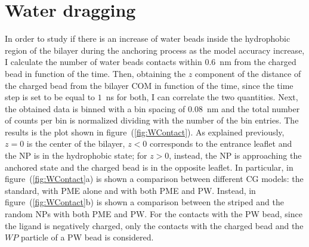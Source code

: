 \section{Water dragging}
\label{sec:WDragging}
In order to study if there is an increase of water beads inside the hydrophobic region of the bilayer during the anchoring process as the model accuracy increase, I calculate the number of water beads contacts within $0.6$~nm from the charged bead in function of the time. Then, obtaining the $z$ component of the distance of the charged bead from the bilayer \ac{COM} in function of the time, since the time step is set to be equal to $1$~ns for both, I can correlate the two quantities. Next, the obtained data is binned with a bin spacing of $0.08$~nm and the total number of counts per bin is normalized dividing with the number of the bin entries. The results is the plot shown in figure~(\ref{fig:WContact}). As explained previously, $z=0$ is the center of the bilayer, $z<0$ corresponds to the entrance leaflet and the \ac{NP} is in the hydrophobic state; for $z>0$, instead, the \ac{NP} is approaching the anchored state and the charged bead is in the opposite leaflet. In particular, in figure~(\ref{fig:WContact}a) is shown a comparison between different \ac{CG} \martini models: the standard, with \ac{PME} alone and with both \ac{PME} and \ac{PW}. Instead, in figure~(\ref{fig:WContact}b) is shown a comparison between the striped and the random \acp{NP} with both \ac{PME} and \ac{PW}. For the contacts with the \ac{PW} bead, since the ligand is negatively charged, only the contacts with the charged bead and the $WP$ particle of a \ac{PW} bead is considered.
